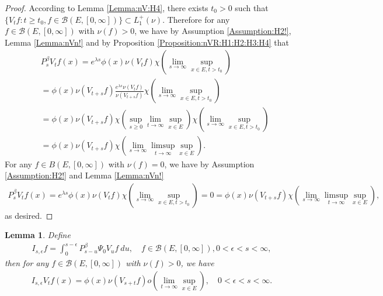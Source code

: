 \documentclass[12pt,a4paper]{amsart}
\numberwithin{equation}{section}
\theoremstyle{plain}
\newtheorem{lem}[thm]{Lemma}
\theoremstyle{definition}
\theoremstyle{remark}
\begin{document}
\begin{proof}
According to Lemma \ref{Lemma:nV:H4}, there exists $t_0 > 0$ such that $\{V_tf: t\geq t_0, f\in \mathcal B(E,[0,\infty])\} \subset L_1^+(\nu)$.
Therefore for any $f\in \mathcal B(E,[0,\infty])$ with $\nu(f)>0$, we have  by Assumption \ref{Assumption:H2!}, Lemma \ref{Lemma:nVn!} and by Proposition \ref{Proposition:nVR:H1:H2:H3:H4} that
\begin{align}
&P_s^\beta V_t f(x)
= e^{\lambda s} \phi(x) \nu(V_tf) \chi(\lim_{s\to \infty} \sup_{x\in E, t > t_0})
\\&=\phi(x) \nu(V_{t+s}f)  \frac{e^{\lambda s} \nu(V_tf)}{ \nu(V_{t+s}f)} \chi(\lim_{s\to \infty}\sup_{x\in E, t> t_0})
\\&= \phi(x) \nu(V_{t+s}f) \chi(\sup_{s\geq 0}\lim_{t\to \infty}\sup_{x\in E}) \chi(\lim_{s\to \infty} \sup_{x\in E, t> t_0})
\\&= \phi(x)\nu(V_{t+s}f)\chi(\lim_{s\to \infty} \limsup_{t\to \infty} \sup_{x\in E}).
\end{align}
For any $f\in B(E,[0,\infty])$ with $\nu(f)= 0$, we have by Assumption \ref{Assumption:H2!} and Lemma \ref{Lemma:nVn!} 
\begin{align}
 P_s^\beta V_t f(x)
 = e^{\lambda s} \phi(x) \nu(V_tf) \chi(\lim_{s\to \infty} \sup_{x\in E, t > t_0})
= 0
 = \phi(x)\nu(V_{t+s}f)\chi(\lim_{s\to \infty} \limsup_{t\to \infty} \sup_{x\in E}),
 \end{align}
as desired.
\end{proof}
\begin{lem} \label{Lemma:IVf:H1:H2:H3:H4}
Define
\begin{align}
 I_{s,\epsilon} f
 = \int_0^{s - \epsilon} P_{s - u}^\beta \Psi_0 V_u f ~du,
 \quad f\in \mathcal B(E,[0,\infty]), 0 < \epsilon < s < \infty,
 \end{align}
then for any $f\in \mathcal B(E,[0,\infty])$ with $\nu(f)>0$, we have
\begin{align}
 I_{s,\epsilon}V_t f(x)
 = \phi(x) \nu(V_{s+t} f) o(\lim_{t\to \infty} \sup_{x\in E}),
 \quad 0 < \epsilon < s< \infty.
 \end{align}
\end{lem}
\end{document}
